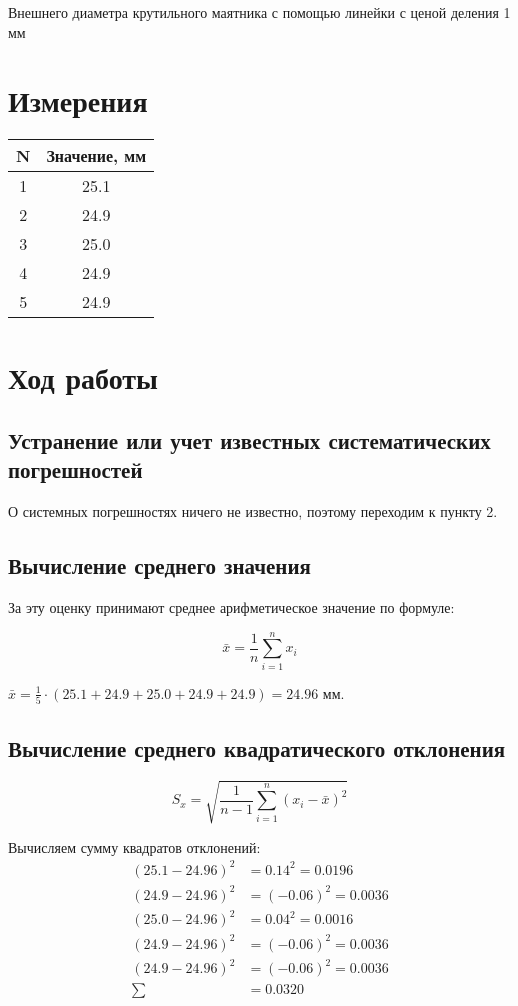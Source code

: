 \documentclass[12pt, a4paper]{article}
\begin{document}
	Внешнего диаметра крутильного маятника с помощью линейки с ценой деления
	1 мм
	
	\section*{Измерения}
	
	\begin{center}
		\begin{tabular}{|c|c|}
			\hline
			N & Значение, мм \\\hline
			1 & 25.1 \\\hline
			2 & 24.9 \\\hline
			3 & 25.0 \\\hline
			4 & 24.9 \\\hline
			5 & 24.9 \\\hline
		\end{tabular}
	\end{center}
	
	\section*{Ход работы}
	
	\subsection*{Устранение или учет известных систематических погрешностей}
	
	О системных погрешностях ничего не известно, поэтому переходим к пункту 2.
	
	\subsection*{Вычисление среднего значения}
	
	За эту оценку принимают среднее арифметическое значение по формуле:
	
	$$\bar{x} = \frac{1}{n} \sum_{i = 1}^{n} x_i$$
	
	$\bar{x} = \frac{1}{5} \cdot (25.1 + 24.9 + 25.0 + 24.9 + 24.9) = 24.96$ мм.
	
	\subsection*{Вычисление среднего квадратического отклонения}
	
	$$S_x = \sqrt{\frac{1}{n-1} \sum_{i = 1}^{n} (x_i - \bar{x})^2}$$
	
	Вычисляем сумму квадратов отклонений:
	\begin{align*}
		(25.1 - 24.96)^2 &= 0.14^2 = 0.0196 \\
		(24.9 - 24.96)^2 &= (-0.06)^2 = 0.0036 \\
		(25.0 - 24.96)^2 &= 0.04^2 = 0.0016 \\
		(24.9 - 24.96)^2 &= (-0.06)^2 = 0.0036 \\
		(24.9 - 24.96)^2 &= (-0.06)^2 = 0.0036 \\
		\sum &= 0.0320
	\end{align*}
	
\end{document}
